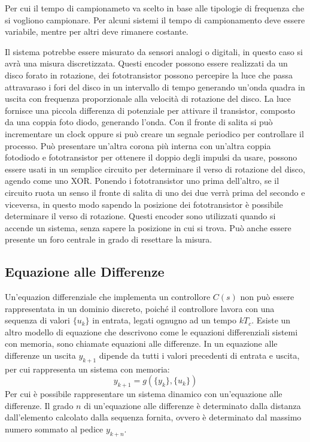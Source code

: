 \documentclass{article}
\numberwithin{equation}{subsection}
\begin{document}
Per cui il tempo di campionameto va scelto in base alle tipologie di frequenza che si vogliono campionare. Per alcuni sistemi il tempo di campionamento deve essere variabile, 
mentre per altri deve rimanere costante. 


Il sistema potrebbe essere misurato da sensori analogi o digitali, in questo caso si avrà una misura discretizzata. Questi encoder possono essere realizzati da un disco 
forato in rotazione, dei fototransistor possono percepire la luce che passa attravaraso i fori del disco in un intervallo di tempo generando un'onda quadra in uscita con 
frequenza proporzionale alla velocità di rotazione del disco. La luce fornisce una piccola differenza di potenziale per attivare il transistor, composto da una coppia 
foto diodo, generando l'onda. Con il fronte di salita si può incrementare un clock oppure si può creare un segnale periodico per controllare il processo. 
Può presentare un'altra corona più interna con un'altra coppia fotodiodo e fototransistor per ottenere il doppio degli impulsi da usare, possono essere usati in un semplice 
circuito per determinare il verso di rotazione del disco, agendo come uno XOR. 
Ponendo i fototransistor uno prima dell'altro, se il circuito ruota un senso il fronte di salita di uno dei due verrà prima del secondo e viceversa, in questo modo 
sapendo la posizione dei fototransistor è possibile determinare il verso di rotazione. 
Questi encoder sono utilizzati quando si accende un sistema, senza sapere la posizione in cui si trova. Può anche essere presente un foro centrale in grado di 
resettare la misura. 

\subsection{Equazione alle Differenze}

Un'equazion differenziale che implementa un controllore $C(s)$ non può essere rappresentata in un dominio discreto, poiché il controllore lavora con una sequenza di valori 
$\{u_k\}$ in entrata, legati ognugno ad un tempo $kT_c$. Esiste un altro modello di equazione che descrivono come le equazioni differenziali sistemi con memoria, sono chiamate 
equazioni alle differenze. In un equazione alle differenze un uscita $y_{k+1}$ dipende da tutti i valori precedenti di entrata e uscita, per cui rappresenta un sistema con 
memoria: 
\begin{equation}
    y_{k+1}=g\left(\{y_k\},\{u_k\}\right)
\end{equation}
Per cui è possibile rappresentare un sistema dinamico con un'equazione alle differenze. Il grado $n$ di un'equazione alle differenze è determinato dalla distanza dall'elemento 
calcolato dalla sequenza fornita, ovvero è determinato dal massimo numero sommato al pedice $y_{k+n}$. 
\end{document}
